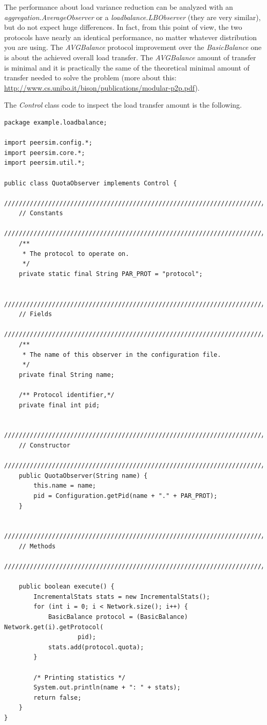 \documentclass[a4paper,11pt]{article}
\begin{document}
The performance about load variance reduction can be analyzed with
an \emph{aggregation.AverageObserver} or a \emph{loadbalance.LBObserver}
(they are very similar), but do not expect huge differences. In fact,
from this point of view, the two protocols have nearly an identical
performance, no matter whatever distribution you are using. The 
\emph{AVGBalance}
protocol improvement over the \emph{BasicBalance} one is about the
achieved overall load transfer. The \emph{AVGBalance} amount of transfer
is minimal and it is practically the same of the theoretical minimal
amount of transfer needed to solve the problem 
(more about this: \url{http://www.cs.unibo.it/bison/publications/modular-p2p.pdf}). 

The \emph{Control} class code to inspect the load transfer amount
is the following. 

\footnotesize
\begin{verbatim}
package example.loadbalance;

import peersim.config.*;
import peersim.core.*;
import peersim.util.*;

public class QuotaObserver implements Control {
    /////////////////////////////////////////////////////////////////////////
    // Constants
    /////////////////////////////////////////////////////////////////////////
    /**
     * The protocol to operate on.
     */
    private static final String PAR_PROT = "protocol";

    /////////////////////////////////////////////////////////////////////////
    // Fields
    /////////////////////////////////////////////////////////////////////////
    /**
     * The name of this observer in the configuration file.
     */
    private final String name;

    /** Protocol identifier,*/
    private final int pid;

    /////////////////////////////////////////////////////////////////////////
    // Constructor
    /////////////////////////////////////////////////////////////////////////
    public QuotaObserver(String name) {
        this.name = name;
        pid = Configuration.getPid(name + "." + PAR_PROT);
    }

    /////////////////////////////////////////////////////////////////////////
    // Methods
    /////////////////////////////////////////////////////////////////////////

    public boolean execute() {
        IncrementalStats stats = new IncrementalStats();
        for (int i = 0; i < Network.size(); i++) {
            BasicBalance protocol = (BasicBalance) Network.get(i).getProtocol(
                    pid);
            stats.add(protocol.quota);
        }

        /* Printing statistics */
        System.out.println(name + ": " + stats);
        return false;
    }
}
\end{verbatim}
\normalsize
\end{document}
